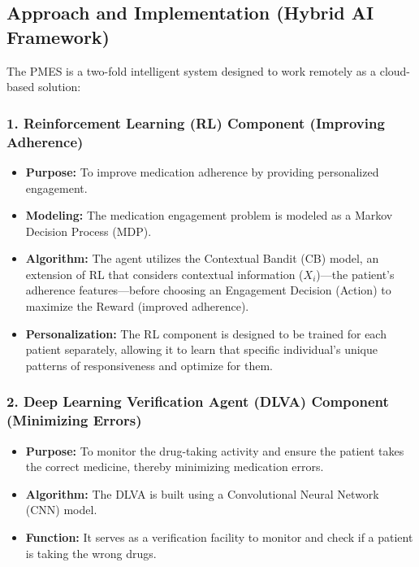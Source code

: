 \subsection*{Approach and Implementation (Hybrid AI Framework)}
The PMES is a two-fold intelligent system designed to work remotely as a cloud-based solution:

\subsubsection*{1. Reinforcement Learning (RL) Component (Improving Adherence)}
\begin{itemize}
    \item \textbf{Purpose:} To improve medication adherence by providing personalized engagement.
    \item \textbf{Modeling:} The medication engagement problem is modeled as a Markov Decision Process (MDP).
    \item \textbf{Algorithm:} The agent utilizes the Contextual Bandit (CB) model, an extension of RL that considers contextual information ($X_i$)---the patient's adherence features---before choosing an Engagement Decision (Action) to maximize the Reward (improved adherence).
    \item \textbf{Personalization:} The RL component is designed to be trained for each patient separately, allowing it to learn that specific individual's unique patterns of responsiveness and optimize for them.
\end{itemize}

\subsubsection*{2. Deep Learning Verification Agent (DLVA) Component (Minimizing Errors)}
\begin{itemize}
    \item \textbf{Purpose:} To monitor the drug-taking activity and ensure the patient takes the correct medicine, thereby minimizing medication errors.
    \item \textbf{Algorithm:} The DLVA is built using a Convolutional Neural Network (CNN) model.
    \item \textbf{Function:} It serves as a verification facility to monitor and check if a patient is taking the wrong drugs.
\end{itemize}

